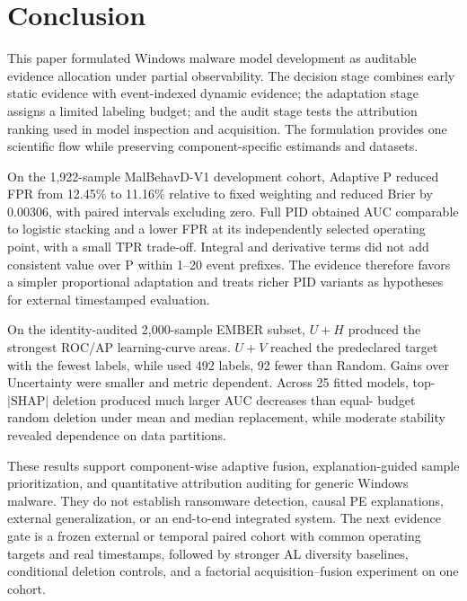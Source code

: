 \section{Conclusion}
\label{sec:conclusion}

This paper formulated Windows malware model development as auditable evidence
allocation under partial observability. The decision stage combines early static
evidence with event-indexed dynamic evidence; the adaptation stage assigns a
limited labeling budget; and the audit stage tests the attribution ranking used
in model inspection and acquisition. The formulation provides one scientific
flow while preserving component-specific estimands and datasets.

On the 1,922-sample MalBehavD-V1 development cohort, Adaptive P reduced FPR from
12.45\% to 11.16\% relative to fixed weighting and reduced Brier by 0.00306,
with paired intervals excluding zero. Full PID obtained AUC comparable to
logistic stacking and a lower FPR at its independently selected operating point,
with a small TPR trade-off. Integral and derivative terms did not add consistent
value over P within 1--20 event prefixes. The evidence therefore favors a
simpler proportional adaptation and treats richer PID variants as hypotheses for
external timestamped evaluation.

On the identity-audited 2,000-sample EMBER subset, $U+H$ produced the strongest
ROC/AP learning-curve areas. $U+V$ reached the predeclared target with the fewest
labels, while \xfull used 492 labels, 92 fewer than Random. Gains over
Uncertainty were smaller and metric dependent. Across 25 fitted models,
top-$|\mathrm{SHAP}|$ deletion produced much larger AUC decreases than equal-
budget random deletion under mean and median replacement, while moderate
stability revealed dependence on data partitions.

These results support component-wise adaptive fusion, explanation-guided sample
prioritization, and quantitative attribution auditing for generic Windows
malware. They do not establish ransomware detection, causal PE explanations,
external generalization, or an end-to-end integrated system. The next evidence
gate is a frozen external or temporal paired cohort with common operating targets
and real timestamps, followed by stronger AL diversity baselines, conditional
deletion controls, and a factorial acquisition--fusion experiment on one cohort.
